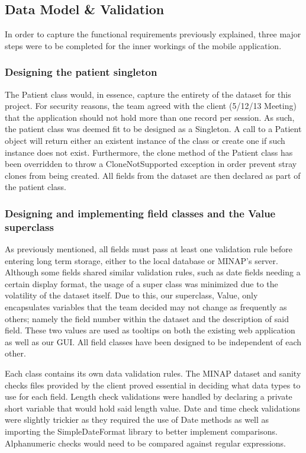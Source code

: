 \documentclass[12pt,a4paper,oneside,titlepage]{article}
\begin{document}
\subsection{Data Model \& Validation}
In order to capture the functional requirements previously explained, three major steps were to be completed for the inner workings of the mobile application.

\subsubsection{Designing the patient singleton}
The Patient class would, in essence, capture the entirety of the dataset for this project. For security reasons, the team agreed with the client (5/12/13 Meeting) that the application should not hold more than one record per session. As such, the patient class was deemed fit to be designed as a Singleton. A call to a Patient object will return either an existent instance of the class or create one if such instance does not exist. Furthermore, the clone method of the Patient class has been overridden to throw a CloneNotSupported exception in order prevent stray clones from being created. All fields from the dataset are then declared as part of the patient class.

\subsubsection{Designing and implementing field classes and the Value superclass}
As previously mentioned, all fields must pass at least one validation rule before entering long term storage, either to the local database or MINAP's server. Although some fields shared similar validation rules, such as date fields needing a certain display format, the usage of a super class was minimized due to the volatility of the dataset itself. Due to this, our superclass, Value, only encapsulates variables that the team decided may not change as frequently as others; namely the field number within the dataset and the description of said field. These two values are used as tooltips on both the existing web application as well as our GUI. All field classes have been designed to be independent of each other.

Each class contains its own data validation rules. The MINAP dataset and sanity checks files provided by the client proved essential in deciding what data types to use for each field. Length check validations were handled by declaring a private short variable that would hold said length value. Date and time check validations were slightly trickier as they required the use of Date methods as well as importing the SimpleDateFormat library to better implement comparisons. Alphanumeric checks would need to be compared against regular expressions.
\end{document}
